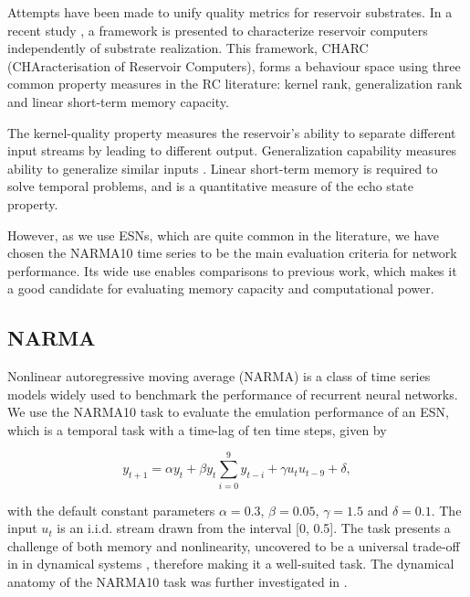 Attempts have been made to unify quality metrics for reservoir substrates. In a
recent study \cite{dale_substrate-independent_2019}, a framework is presented to
characterize reservoir computers independently of substrate realization. This
framework, CHARC (CHAracterisation of Reservoir Computers), forms a behaviour
space using three common property measures in the RC literature: kernel rank,
generalization rank and linear short-term memory capacity.

The kernel-quality property \cite{legenstein_edge_2007} measures the reservoir's
ability to separate different input streams by leading to different output.
Generalization capability measures ability to generalize similar inputs
\cite{legenstein_edge_2007}. Linear short-term memory \cite{jaeger_short_2002}
is required to solve temporal problems, and is a quantitative measure of the
echo state property.

However, as we use ESNs, which are quite common in the literature, we have
chosen the NARMA10 time series to be the main evaluation criteria for network
performance. Its wide use enables comparisons to previous work, which makes it a
good candidate for evaluating memory capacity and computational power.

\subsection{NARMA}

Nonlinear autoregressive moving average (NARMA) \cite{atiya_new_2000} is a class
of time series models widely used to benchmark the performance of recurrent
neural networks. We use the NARMA10 task to evaluate the emulation performance
of an ESN, which is a temporal task with a time-lag of ten time steps, given by


\begin{equation}
  y_{t+1} = \alpha y_{t} +
  \beta y_{t} \sum_{i=0}^{9}y_{t-i} +
  \gamma u_{t}u_{t-9} +
  \delta,
  \label{narma}
\end{equation}

\noindent with the default constant parameters $\alpha = 0.3$, $\beta = 0.05$,
$\gamma = 1.5$ and $\delta = 0.1$. The input $u_{t}$ is an i.i.d. stream drawn
from the interval [0, 0.5]. The task presents a challenge of both memory and
nonlinearity, uncovered to be a universal trade-off in in dynamical systems
\cite{dambre_information_2012, verstraeten_memory_2010}, therefore making it a
well-suited task. The dynamical anatomy of the NARMA10 task was further
investigated in \cite{kubota_dynamical_2019}.



